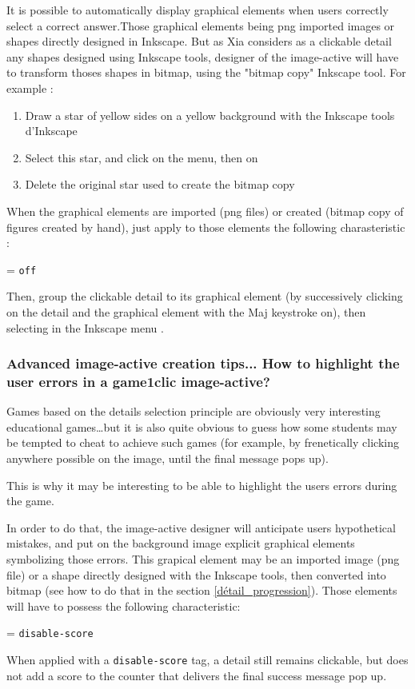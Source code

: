 It is possible to automatically display graphical elements when users correctly 
select a correct answer.Those graphical elements being png imported images or 
shapes directly designed in Inkscape. But as Xia considers as a clickable 
detail any shapes designed using Inkscape tools, designer of the image-active 
will have to transform thoses shapes in bitmap, using the "bitmap copy" Inkscape tool. 
For example :
\begin{enumerate}
 \item Draw  a star of yellow sides on a yellow background with the  Inkscape tools 
d'Inkscape
 \item Select this star, and click on the  menu, then on 
 \item Delete the original star used to create the bitmap copy
\end{enumerate}

When the graphical elements are imported (png files) or created (bitmap copy 
of figures created by hand), just apply to those elements the following 
charasteristic :
\begin{center}
 = \verb|off|
\end{center}
Then, group the clickable detail to its graphical element (by successively 
clicking on the detail and the graphical element with the Maj keystroke on),
then selecting  in the Inkscape menu .

\subsubsection{Advanced image-active creation tips... How to highlight the user errors in a game1clic image-active?}

Games based on the details selection principle are obviously very
interesting educational games\ldots but it is also quite obvious to guess how some students may be tempted to cheat to achieve such games (for example, by 
frenetically clicking anywhere possible on the image, until the final message pops up).

This is why it may be interesting to be able to 
highlight the users errors during the game.

In order to do that, the image-active designer will anticipate users hypothetical mistakes, and 
put on the background image explicit graphical elements symbolizing those errors. 
This grapical element may be an imported image 
(png file) or a shape directly designed with the Inkscape tools, 
then converted into bitmap (see how to do that in the section 
\ref{détail_progression}). Those elements will have to possess the following characteristic:
\begin{center}
 = \verb|disable-score| 
\end{center}
When applied with a \verb|disable-score| tag, a detail still remains clickable, but does not 
add a score to the counter that delivers the final success message pop up.

